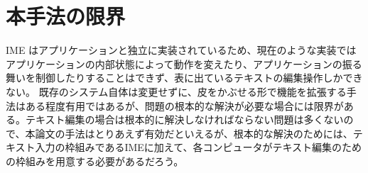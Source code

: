 \section{本手法の限界}
IME はアプリケーションと独立に実装されているため、現在のような実装ではアプリケーションの内部状態によって動作を変えたり、アプリケーションの振る舞いを制御したりすることはできず、表に出ているテキストの編集操作しかできない。 既存のシステム自体は変更せずに、皮をかぶせる形で機能を拡張する手法はある程度有用ではあるが、問題の根本的な解決が必要な場合には限界がある。テキスト編集の場合は根本的に解決しなければならない問題は多くないので、本論文の手法はとりあえず有効だといえるが、根本的な解決のためには、テキスト入力の枠組みであるIMEに加えて、各コンピュータがテキスト編集のための枠組みを用意する必要があるだろう。